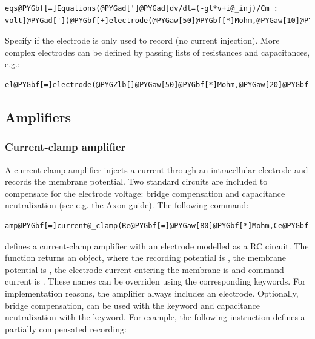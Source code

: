\documentclass[letterpaper,10pt,english]{manual}
\begin{document}
\begin{Verbatim}[commandchars=@\[\]]
eqs@PYGbf[=]Equations(@PYGad[']@PYGad[dv/dt=(-gl*v+i@_inj)/Cm : volt]@PYGad['])@PYGbf[+]electrode(@PYGaw[50]@PYGbf[*]Mohm,@PYGaw[10]@PYGbf[*]pF,vm@PYGbf[=]@PYGad[']@PYGad[v]@PYGad['],i@_cmd@PYGbf[=]@PYGbf[.]@PYGaw[5]@PYGbf[*]nA)
\end{Verbatim}

Specify  if the electrode is only used to record (no current injection). More complex
electrodes can be defined by passing lists of resistances and capacitances, e.g.:

\begin{Verbatim}[commandchars=@\[\]]
el@PYGbf[=]electrode(@PYGZlb[]@PYGaw[50]@PYGbf[*]Mohm,@PYGaw[20]@PYGbf[*]Mohm@PYGZrb[],@PYGZlb[]@PYGaw[5]@PYGbf[*]pF,@PYGaw[3]@PYGbf[*]pF@PYGZrb[])
\end{Verbatim}


\subsection{Amplifiers}


\subsubsection{Current-clamp amplifier}

A current-clamp amplifier injects a current through an intracellular electrode
and records the membrane potential. Two standard circuits are included to compensate
for the electrode voltage: bridge compensation and capacitance neutralization
(see e.g. the \href{http://www.moleculardevices.com/pages/instruments/axon\_guide.html}{Axon guide}).
The following command:

\begin{Verbatim}[commandchars=@\[\]]
amp@PYGbf[=]current@_clamp(Re@PYGbf[=]@PYGaw[80]@PYGbf[*]Mohm,Ce@PYGbf[=]@PYGaw[10]@PYGbf[*]pF)
\end{Verbatim}

defines a current-clamp amplifier with an electrode modelled as a RC circuit. The function
returns an \hyperlink{brian.Equations}{} object, where
the recording potential is , the membrane potential is , the electrode current
entering the membrane is  and command current is .
These names can be overriden using the corresponding keywords.
For implementation reasons, the amplifier always includes an electrode.
Optionally, bridge compensation, can be used with the  keyword and capacitance
neutralization with the  keyword. For example, the following instruction defines
a partially compensated recording:
\end{document}
